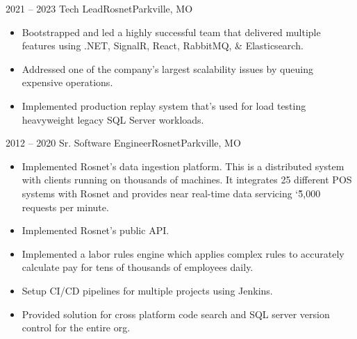 \documentclass[11pt,letterpaper,final]{moderncv}
\begin{document}
	\cventry
{2021 -- 2023} {Tech Lead}{Rosnet}{Parkville, MO}{}{
		\begin{itemize}
			\item
				Bootstrapped and led a highly successful team that delivered
				multiple features using .NET, SignalR, React, RabbitMQ, \&
				Elasticsearch.
			\item
				Addressed one of the company's largest scalability issues by
				queuing expensive operations.
			\item
				Implemented production replay system that's used for load
				testing heavyweight legacy SQL Server workloads.
		\end{itemize}
}
\linebreak

	\cventry
{2012 -- 2020} {Sr. Software Engineer}{Rosnet}{Parkville, MO}{}{
		\begin{itemize}
			\item
				Implemented Rosnet's data ingestion platform. This is a
				distributed system with clients running on thousands of
				machines. It integrates 25 different POS systems with Rosnet and
				provides near real-time data servicing \char`\~5,000 requests
				per minute.
			\item
				Implemented Rosnet's public API. 
			\item
				Implemented a labor rules engine which applies complex rules to
				accurately calculate pay for tens of thousands of employees
				daily.
			\item
				Setup CI/CD pipelines for multiple projects using Jenkins.
			\item
				Provided solution for cross platform code search and SQL server
				version control for the entire org.
		\end{itemize}
}
\linebreak
\end{document}
